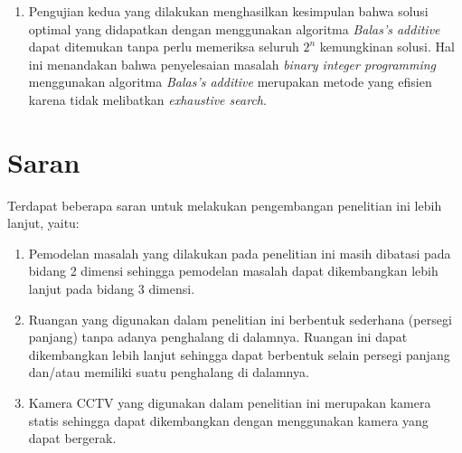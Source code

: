 \begin{enumerate}
	\item Pengujian kedua yang dilakukan menghasilkan kesimpulan bahwa solusi optimal yang didapatkan dengan menggunakan algoritma \textit{Balas's additive} dapat ditemukan tanpa perlu memeriksa seluruh \(2^n\) kemungkinan solusi. Hal ini menandakan bahwa penyelesaian masalah \textit{binary integer programming} menggunakan algoritma \textit{Balas's additive} merupakan metode yang efisien karena tidak melibatkan \textit{exhaustive search}.
\end{enumerate}

\section{Saran}
Terdapat beberapa saran untuk melakukan pengembangan penelitian ini lebih lanjut, yaitu:
\begin{enumerate}
	\item Pemodelan masalah yang dilakukan pada penelitian ini masih dibatasi pada bidang 2 dimensi sehingga pemodelan masalah dapat dikembangkan lebih lanjut pada bidang 3 dimensi.
	\item Ruangan yang digunakan dalam penelitian ini berbentuk sederhana (persegi panjang) tanpa adanya penghalang di dalamnya. Ruangan ini dapat dikembangkan lebih lanjut sehingga dapat berbentuk selain persegi panjang dan/atau memiliki suatu penghalang di dalamnya.
	\item Kamera CCTV yang digunakan dalam penelitian ini merupakan kamera statis sehingga dapat dikembangkan dengan menggunakan kamera yang dapat bergerak.
\end{enumerate}